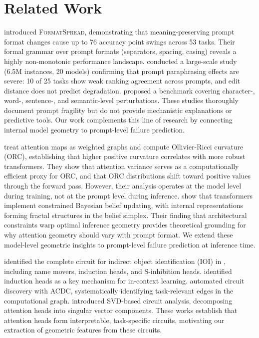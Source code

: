 \section{Related Work}
\label{sec:related}

\citet{sclar2023quantifying} introduced \textsc{FormatSpread}, demonstrating that meaning-preserving prompt format changes cause up to 76 accuracy point swings across 53 tasks. Their formal grammar over prompt formats (separators, spacing, casing) reveals a highly non-monotonic performance landscape.
\citet{mizrahi2024state} conducted a large-scale study (6.5M instances, 20 models) confirming that prompt paraphrasing effects are severe: 10 of 25 tasks show weak ranking agreement across prompts, and edit distance does not predict degradation.
\citet{zhu2023promptbench} proposed a benchmark covering character-, word-, sentence-, and semantic-level perturbations.
These studies thoroughly document prompt fragility but do not provide mechanistic explanations or predictive tools. Our work complements this line of research by connecting internal model geometry to prompt-level failure prediction.

\citet{park2024geometry} treat attention maps as weighted graphs and compute Ollivier-Ricci curvature (ORC), establishing that higher positive curvature correlates with more robust transformers.
They show that attention variance serves as a computationally efficient proxy for ORC, and that ORC distributions shift toward positive values through the forward pass.
However, their analysis operates at the model level during training, not at the prompt level during inference.
\citet{piotrowski2025constrained} show that transformers implement constrained Bayesian belief updating, with internal representations forming fractal structures in the belief simplex.
Their finding that architectural constraints warp optimal inference geometry provides theoretical grounding for why attention geometry should vary with prompt format.
We extend these model-level geometric insights to prompt-level failure prediction at inference time.

\citet{wang2022interpretability} identified the complete circuit for indirect object identification (IOI) in \gptsmall, including name movers, induction heads, and S-inhibition heads.
\citet{olsson2022context} identified induction heads as a key mechanism for in-context learning.
\citet{conmy2023towards} automated circuit discovery with ACDC, systematically identifying task-relevant edges in the computational graph.
\citet{bussman2025beyond} introduced SVD-based circuit analysis, decomposing attention heads into singular vector components.
These works establish that attention heads form interpretable, task-specific circuits, motivating our extraction of geometric features from these circuits.

